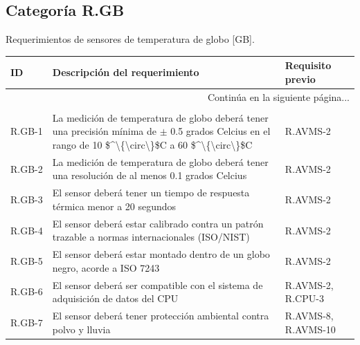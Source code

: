 \documentclass{article}%
\begin{document}
\subsection{Categoría R.GB}%
\label{subsec:CategoraR.GB}%
Requerimientos de sensores de temperatura de globo [GB].\newline%
\newline%
%
\begin{longtable}{|p{2cm}|p{9cm}|p{2.5cm}|}%
\hline%
ID&Descripción del requerimiento&Requisito previo\\%
\hline%
\endhead%
\hline%
\multicolumn{3}{|r|}{Continúa en la siguiente página...}\\%
\hline%
\endfoot%
\hline%
\multicolumn{3}{|r|}{Fin de la tabla}\\%
\hline%
\endlastfoot%
R.GB{-}1& La medición de temperatura de globo deberá tener una precisión mínima de $\pm$ 0.5 grados Celcius en el rango de 10 \$\^{}\textbackslash{}\{\textbackslash{}circ\textbackslash{}\}\$C a 60 \$\^{}\textbackslash{}\{\textbackslash{}circ\textbackslash{}\}\$C& R.AVMS{-}2\\%
\hline%
R.GB{-}2& La medición de temperatura de globo deberá tener una resolución de al menos 0.1 grados Celcius& R.AVMS{-}2\\%
\hline%
R.GB{-}3& El sensor deberá tener un tiempo de respuesta térmica menor a 20 segundos& R.AVMS{-}2\\%
\hline%
R.GB{-}4& El sensor deberá estar calibrado contra un patrón trazable a normas internacionales (ISO/NIST)& R.AVMS{-}2\\%
\hline%
R.GB{-}5& El sensor deberá estar montado dentro de un globo negro, acorde a ISO 7243& R.AVMS{-}2\\%
\hline%
R.GB{-}6& El sensor deberá ser compatible con el sistema de adquisición de datos del CPU& R.AVMS{-}2, R.CPU{-}3\\%
\hline%
R.GB{-}7& El sensor deberá tener protección ambiental contra polvo y lluvia& R.AVMS{-}8, R.AVMS{-}10\\%
\hline%
\end{longtable}

%
\newpage%
\end{document}
